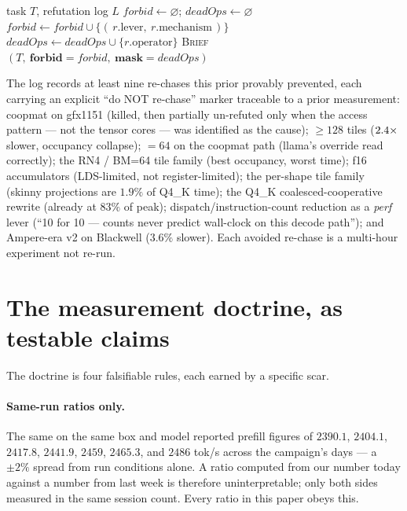 \documentclass[11pt]{article}
\begin{document}
\begin{algorithm}[h]
\caption{\textsc{SeedBrief} --- inject refutations as negative priors}
\label{alg:seed}
\begin{algorithmic}[1]
\Require task $T$, refutation log $L$
\State $\mathit{forbid} \gets \varnothing$; \; $\mathit{deadOps} \gets \varnothing$
     \State $\mathit{forbid} \gets \mathit{forbid} \cup \{(\,r.\text{lever},\ r.\text{mechanism}\,)\}$
  \EndIf
   \State $\mathit{deadOps} \gets \mathit{deadOps} \cup \{r.\text{operator}\}$ \EndIf
\EndFor
\State \Return \textsc{Brief}$(T,\ \mathbf{forbid}{=}\mathit{forbid},\ \mathbf{mask}{=}\mathit{deadOps})$
\end{algorithmic}
\end{algorithm}

The log records at least nine re-chases this prior provably prevented, each carrying an explicit ``do NOT
re-chase'' marker traceable to a prior measurement: coopmat on gfx1151 (killed, then partially un-refuted
only when the access pattern --- not the tensor cores --- was identified as the cause); ${\ge}128$
tiles ($2.4\times$ slower, occupancy collapse); ${=}64$ on the coopmat path (llama's override read
correctly); the RN4 / BM=64 tile family (best occupancy, worst time); f16 accumulators (LDS-limited, not
register-limited); the per-shape tile family (skinny projections are $1.9\%$ of Q4\_K time); the Q4\_K
coalesced-cooperative rewrite (already at $83\%$ of peak); dispatch/instruction-count reduction as a
\emph{perf} lever (``10 for 10 --- counts never predict wall-clock on this decode path''); and Ampere-era
 v2 on Blackwell ($3.6\%$ slower). Each avoided re-chase is a multi-hour experiment not
re-run.

\section{The measurement doctrine, as testable claims}
\label{sec:doctrine}

The doctrine is four falsifiable rules, each earned by a specific scar.

\paragraph{Same-run ratios only.} The same  on the same box and model reported prefill
figures of $2390.1$, $2404.1$, $2417.8$, $2441.9$, $2459$, $2465.3$, and $2486$ tok/s across the campaign's
days --- a $\pm2\%$ spread from run conditions alone. A ratio computed from our number today against a
 number from last week is therefore uninterpretable; only both sides measured in the same
session count. Every ratio in this paper obeys this.
\end{document}

